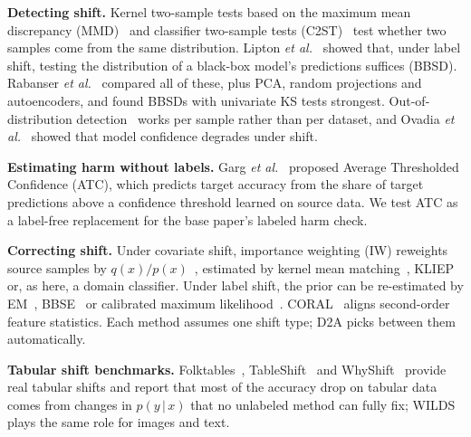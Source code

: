 \documentclass[conference]{IEEEtran}
\newcommand{\Dtwo}{\textsc{D2A}}
\begin{document}
\textbf{Detecting shift.} Kernel two-sample tests based on the maximum mean discrepancy (MMD)~\cite{gretton2012mmd} and classifier two-sample tests (C2ST)~\cite{lopezpaz2017c2st} test whether two samples come from the same distribution. Lipton \emph{et al.}~\cite{lipton2018bbse} showed that, under label shift, testing the distribution of a black-box model's predictions suffices (BBSD). Rabanser \emph{et al.}~\cite{rabanser2019failing} compared all of these, plus PCA, random projections and autoencoders, and found BBSDs with univariate KS tests strongest. Out-of-distribution detection~\cite{hendrycks2017baseline} works per sample rather than per dataset, and Ovadia \emph{et al.}~\cite{ovadia2019trust} showed that model confidence degrades under shift.

\textbf{Estimating harm without labels.} Garg \emph{et al.}~\cite{garg2022atc} proposed Average Thresholded Confidence (ATC), which predicts target accuracy from the share of target predictions above a confidence threshold learned on source data. We test ATC as a label-free replacement for the base paper's labeled harm check.

\textbf{Correcting shift.} Under covariate shift, importance weighting (IW) reweights source samples by $q(x)/p(x)$~\cite{shimodaira2000}, estimated by kernel mean matching~\cite{huang2007kmm}, KLIEP~\cite{sugiyama2008kliep} or, as here, a domain classifier. Under label shift, the prior can be re-estimated by EM~\cite{saerens2002}, BBSE~\cite{lipton2018bbse} or calibrated maximum likelihood~\cite{alexandari2020mlls}. CORAL~\cite{sun2016coral} aligns second-order feature statistics. Each method assumes one shift type; \Dtwo{} picks between them automatically.

\textbf{Tabular shift benchmarks.} Folktables~\cite{ding2021folktables}, TableShift~\cite{gardner2023tableshift} and WhyShift~\cite{liu2023whyshift} provide real tabular shifts and report that most of the accuracy drop on tabular data comes from changes in $p(y\,|\,x)$ that no unlabeled method can fully fix; WILDS~\cite{koh2021wilds} plays the same role for images and text.
\end{document}
